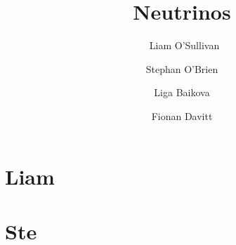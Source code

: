 \documentclass[10pt,twoside]{report}
\title{Neutrinos}
\author{\
    Liam O'Sullivan \and
    Stephan O'Brien \and
    Liga Baikova \and
    Fionan Davitt
}
\begin{document}
\maketitle

\tableofcontents

\chapter{Liam}


\chapter{Ste}





\end{document}
